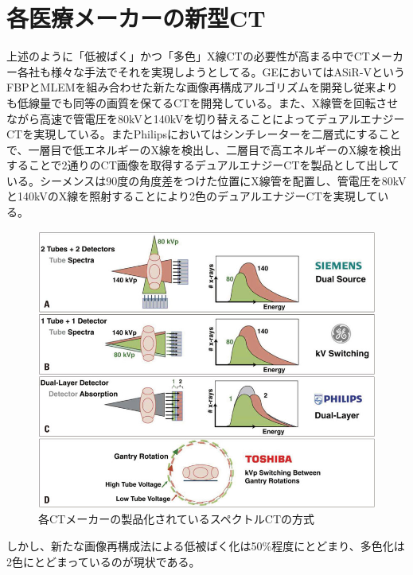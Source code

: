 \section{各医療メーカーの新型CT}
上述のように「低被ばく」かつ「多色」X線CTの必要性が高まる中でCTメーカー各社も様々な手法でそれを実現しようとしてる。GEにおいてはASiR-VというFBPとMLEMを組み合わせた新たな画像再構成アルゴリズムを開発し従来よりも低線量でも同等の画質を保てるCTを開発している。また、X線管を回転させながら高速で管電圧を80kVと140kVを切り替えることによってデュアルエナジーCTを実現している。またPhilipsにおいてはシンチレーターを二層式にすることで、一層目で低エネルギーのX線を検出し、二層目で高エネルギーのX線を検出することで2通りのCT画像を取得するデュアルエナジーCTを製品として出している。シーメンスは90度の角度差をつけた位置にX線管を配置し、管電圧を80kVと140kVのX線を照射することにより2色のデュアルエナジーCTを実現している。

\begin{figure}[H]
 \begin{center}
 \includegraphics[bb=0.000000 0.000000 399.724138 328.220690,width=0.7\hsize]{image2/chapter1/CT_maker.jpg} 
 \end{center}
 \caption{各CTメーカーの製品化されているスペクトルCTの方式}
 \label{fig:maker}
\end{figure}

しかし、新たな画像再構成法による低被ばく化は50\%程度にとどまり、多色化は2色にとどまっているのが現状である。

